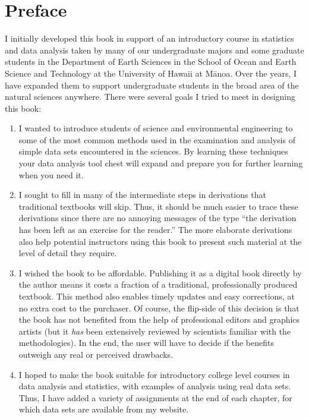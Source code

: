 %
\chapter*{Preface}

I initially developed this book in support of an introductory course in statistics
and data analysis taken by many of our undergraduate majors and some graduate students in the Department of
Earth Sciences in the School of Ocean and Earth Science and Technology at
the University of Hawaii at M\={a}noa.  Over the years, I have
expanded them to support undergraduate students in the broad area of the natural sciences
anywhere.  There were several goals I tried to meet in designing this book:
\begin{enumerate}
\item I wanted to introduce students of science and environmental engineering to some
   of the most common methods used in the examination and analysis of simple data sets
   encountered in the sciences.  By learning these techniques your data analysis tool
   chest will expand and prepare you for further learning when you need it.
\item I sought to fill in many of the intermediate steps in derivations that traditional
   textbooks will skip.  Thus, it should be much easier to trace these derivations since there
   are no annoying messages of the type ``the derivation has been left as an exercise for the reader.''
   The more elaborate derivations also help potential instructors using this book to present such
   material at the level of detail they require.
\item I wished the book to be affordable.  Publishing it as a digital book directly by the author
   means it costs a fraction of a traditional, professionally produced textbook.  This method also enables timely updates
   and easy corrections, at no extra cost to the purchaser.  Of course, the flip-side of this decision
   is that the book has not benefited from the help of professional editors and graphics artists
   (but it \emph{has} been extensively reviewed by scientists familiar with the methodologies).
   In the end, the user will have to decide if the benefits outweigh any real or perceived drawbacks.
\item I hoped to make the book suitable for introductory college level courses in data analysis and statistics, with
   examples of analysis using real data sets.  Thus, I have added a
   variety of assignments at the end of each chapter, for which data sets are available from my website.
\end{enumerate}

